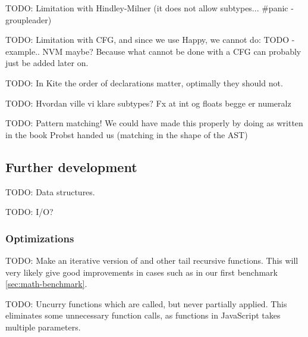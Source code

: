TODO: Limitation with Hindley-Milner (it does not allow subtypes... \#panic - groupleader)

TODO: Limitation with CFG, and since we use Happy, we cannot do: TODO - example.. NVM maybe? Because what cannot be done with a CFG can probably just be added later on.

TODO: In Kite the order of declarations matter, optimally they should not.

TODO: Hvordan ville vi klare subtypes? Fx at int og floats begge er numeralz

TODO: Pattern matching! We could have made this properly by doing as written in the book Probst handed us (matching in the shape of the AST)


\subsection{Further development}

TODO: Data structures.

TODO: I/O?
\subsubsection{Optimizations}
\label{sec:disc-optimization}
TODO: Make an iterative version of  and other tail recursive functions. This will very likely give good improvements in cases such as in our first benchmark \ref{sec:math-benchmark}.

TODO: Uncurry functions which are called, but never partially applied. This eliminates some unnecessary function calls, as functions in JavaScript takes multiple parameters.
